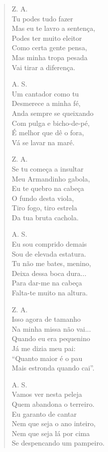 \begin{verse}
Z. A.\\
Tu podes tudo fazer\\
Mas eu te lavro a sentença,\\
Podes ter muito eleitor\\
Como certa gente pensa,\\
Mas minha tropa pesada\\
Vai tirar a diferença.

A. S.\\
Um cantador como tu\\
Desmerece a minha fé,\\
Anda sempre se queixando\\
Com pulga e bicho-de-pé,\\
É melhor que dê o fora,\\
Vá se lavar na maré.


Z. A.\\
Se tu começa a insultar\\
Meu Armandinho gabola,\\
Eu te quebro na cabeça\\
O fundo desta viola,\\
Tiro fogo, tiro estrela\\
Da tua bruta cachola.

A. S.\\
Eu sou comprido demais\\
Sou de elevada estatura.\\
Tu não me bates, menino,\\
Deixa dessa boca dura...\\
Para dar-me na cabeça\\
Falta-te muito na altura.

Z. A.\\
Isso agora de tamanho\\
Na minha missa não vai...\\
Quando eu era pequenino\\
Já me dizia meu pai:\\
“Quanto maior é o pau\\
Mais estronda quando cai”.

A. S.\\
Vamos ver nesta peleja\\
Quem abandona o terreiro.\\
Eu garanto de cantar\\
Nem que seja o ano inteiro,\\
Nem que seja lá por cima\\
Se despencando um pampeiro.



\end{verse}
